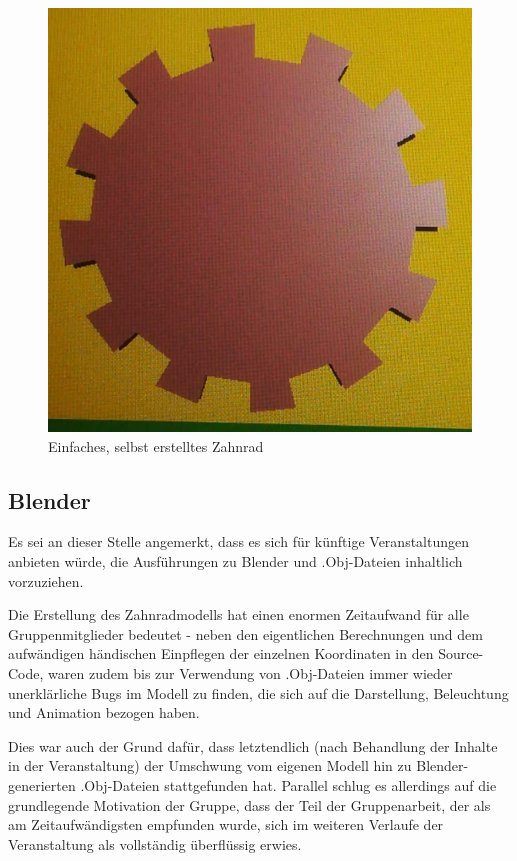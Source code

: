 \documentclass{article}
\begin{document}
\begin{figure}
\centering
\includegraphics[scale=1.0]{Gear.png}
\caption{Einfaches, selbst erstelltes Zahnrad}
\label{fig:gear}
\end{figure}

\subsection{Blender}
Es sei an dieser Stelle angemerkt, dass es sich für künftige Veranstaltungen anbieten würde, die Ausführungen zu Blender und .Obj-Dateien inhaltlich vorzuziehen. 

Die Erstellung des Zahnradmodells hat einen enormen Zeitaufwand für alle Gruppenmitglieder bedeutet - neben den eigentlichen Berechnungen und dem aufwändigen händischen Einpflegen der einzelnen Koordinaten in den Source-Code, waren zudem bis zur Verwendung von .Obj-Dateien immer wieder unerklärliche Bugs im Modell zu finden, die sich auf die Darstellung, Beleuchtung und Animation bezogen haben. 

Dies war auch der Grund dafür, dass letztendlich (nach Behandlung der Inhalte in der Veranstaltung) der Umschwung vom eigenen Modell hin zu Blender-generierten .Obj-Dateien stattgefunden hat. 
Parallel schlug es allerdings auf die grundlegende Motivation der Gruppe, dass der Teil der Gruppenarbeit, der als am Zeitaufwändigsten empfunden wurde, sich im weiteren Verlaufe der Veranstaltung als vollständig überflüssig erwies. 
\newpage
\end{document}

